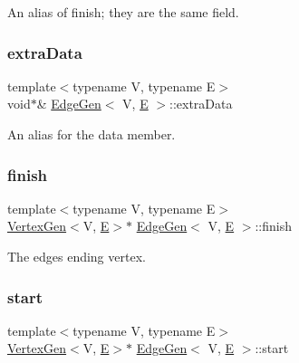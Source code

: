 An alias of finish; they are the same field. 

\mbox{\label{classEdgeGen_a2ee72458d1bd9982be44df73377359d8}} 
\subsubsection{\texorpdfstring{extra\+Data}{extraData}}
{\footnotesize\ttfamily template$<$typename V, typename E$>$ \\
void$\ast$\& \mbox{\hyperlink{classEdgeGen}{Edge\+Gen}}$<$ V, \mbox{\hyperlink{gmath_8h_ab587ba72a9c23f238cb4fd70e2fdb545}{E}} $>$\+::extra\+Data}



An alias for the \textquotesingle{}data\textquotesingle{} member. 

\mbox{\label{classEdgeGen_aa60a74288596350c2d66c545a2a57a4e}} 
\subsubsection{\texorpdfstring{finish}{finish}}
{\footnotesize\ttfamily template$<$typename V, typename E$>$ \\
\mbox{\hyperlink{classVertexGen}{Vertex\+Gen}}$<$V, \mbox{\hyperlink{gmath_8h_ab587ba72a9c23f238cb4fd70e2fdb545}{E}}$>$$\ast$ \mbox{\hyperlink{classEdgeGen}{Edge\+Gen}}$<$ V, \mbox{\hyperlink{gmath_8h_ab587ba72a9c23f238cb4fd70e2fdb545}{E}} $>$\+::finish}



The edge\textquotesingle{}s ending vertex. 

\mbox{\label{classEdgeGen_a07618520fc4dd27e13fbeb28ef912ffb}} 
\subsubsection{\texorpdfstring{start}{start}}
{\footnotesize\ttfamily template$<$typename V, typename E$>$ \\
\mbox{\hyperlink{classVertexGen}{Vertex\+Gen}}$<$V, \mbox{\hyperlink{gmath_8h_ab587ba72a9c23f238cb4fd70e2fdb545}{E}}$>$$\ast$ \mbox{\hyperlink{classEdgeGen}{Edge\+Gen}}$<$ V, \mbox{\hyperlink{gmath_8h_ab587ba72a9c23f238cb4fd70e2fdb545}{E}} $>$\+::start}



